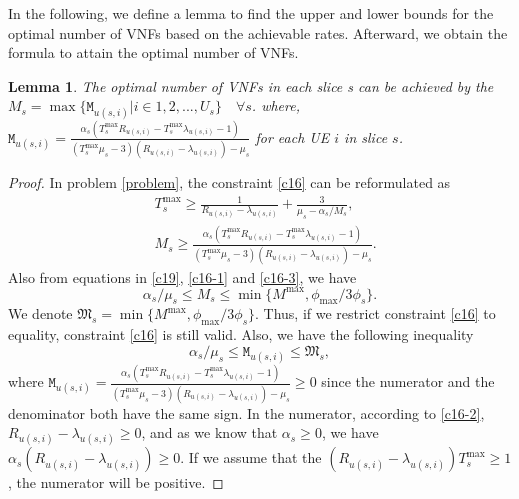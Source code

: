 \documentclass[lettersize,journal]{IEEEtran}
\newtheorem{lemma}{Lemma}
\begin{document}
In the following, we define a lemma to find the upper and lower bounds for the optimal number of VNFs based on the achievable rates. Afterward, we obtain the formula to attain the optimal number of VNFs.
\begin{lemma}\label{lemma1}
The optimal number of VNFs in each slice s can be achieved by the
$M_s = \max\{\mathtt{M}_{u(s,i)} | i \in 1,2,..., U_s\} \quad \forall s$.
where, $\mathtt{M}_{u(s,i)} = \frac{\alpha_s(T^{\text{max}}_s R_{u(s,i)}-T^{\text{max}}_s\lambda_{u(s,i)} -1)}{(T^{\text{max}}_s\mu_s-3)(R_{u(s,i)}-\lambda_{u(s,i)}) - \mu_s }$ for each UE $i$ in slice $s$.
\end{lemma}
\begin{proof}
In problem \eqref{problem}, the constraint \eqref{c16} can be reformulated as
\begin{subequations}
\begin{alignat}{4}
&T^{\max}_s \geq\frac{1}{R_{u(s,i)} - \lambda_{u(s,i)}} + \frac{3}{\mu_s - \alpha_{s}/{M_s}},  \\
&M_s \geq \frac{\alpha_s(T^{\max}_s R_{u(s,i)}-T^{\max}_s\lambda_{u(s,i)} -1)}{(T^{\max}_s\mu_s-3)(R_{u(s,i)}-\lambda_{u(s,i)}) - \mu_s }.
\end{alignat}
\end{subequations}
Also from equations in \eqref{c19}, \eqref{c16-1} and \eqref{c16-3}, we have
\begin{equation}
\alpha_s/\mu_s\leq M_s \leq \min\{M^{\max}, \phi_{\max}/{3\phi_s}\}.
\end{equation}
We denote $ \mathfrak{M}_s= \min\{M^{\max}, \phi_{\max}/{3\phi_s}\}$.
Thus, if we restrict constraint \eqref{c16} to equality, constraint \eqref{c16} is still valid.
Also, we have the following inequality
\begin{equation}\label{eqDelay}
\alpha_s / \mu_s \leq \mathtt{M}_{u(s,i)} \leq \mathfrak{M}_s,
\end{equation}
where $\mathtt{M}_{u(s,i)}=\frac{\alpha_s(T^{\max}_s R_{u(s,i)}-T^{\max}_s\lambda_{u(s,i)} -1)}{(T^{\max}_s\mu_s-3)(R_{u(s,i)}-\lambda_{u(s,i)}) - \mu_s}\ge 0$ since
the numerator and the denominator both have the same sign.
In the numerator, according to \eqref{c16-2}, $ R_{u(s,i)}-\lambda_{u(s,i)} \geq 0$, and as we know that $\alpha_s \geq 0$, we have $ \alpha_s (R_{u(s,i)}-\lambda_{u(s,i)}) \geq 0 $.
If we assume that the $(R_{u(s,i)}-\lambda_{u(s,i)})T^{\max}_s \geq 1$, the numerator will be positive.

\end{proof}
\end{document}
